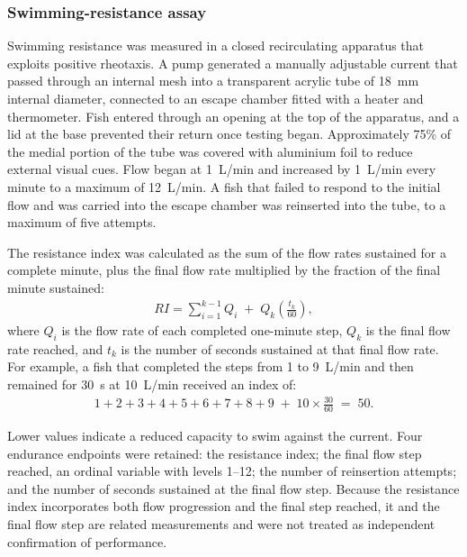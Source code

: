 \documentclass[12pt,a4paper]{article}
\begin{document}
\subsubsection{Swimming-resistance assay}
\label{sec:resistance}
Swimming resistance was measured in a closed recirculating apparatus that exploits positive rheotaxis. A pump generated a manually adjustable current that passed through an internal mesh into a transparent acrylic tube of 18~mm internal diameter, connected to an escape chamber fitted with a heater and thermometer. Fish entered through an opening at the top of the apparatus, and a lid at the base prevented their return once testing began. Approximately 75\% of the medial portion of the tube was covered with aluminium foil to reduce external visual cues. Flow began at 1~L/min and increased by 1~L/min every minute to a maximum of 12~L/min. A fish that failed to respond to the initial flow and was carried into the escape chamber was reinserted into the tube, to a maximum of five attempts.

The resistance index was calculated as the sum of the flow rates sustained for a complete minute, plus the final flow rate multiplied by the fraction of the final minute sustained:
\begin{equation}
\label{eq:resistance-index}
\begin{split}
RI = \sum_{i=1}^{k-1} Q_i \;+\; Q_k\left(\frac{t_k}{60}\right),
\end{split}
\end{equation}
where $Q_i$ is the flow rate of each completed one-minute step, $Q_k$ is the final flow rate reached, and $t_k$ is the number of seconds sustained at that final flow rate. For example, a fish that completed the steps from 1 to 9~L/min and then remained for 30~s at 10~L/min received an index of:
\begin{equation}
\label{eq:resistance-example}
\begin{split}
1+2+3+4+5+6+7+8+9 \;+\; 10 \times \frac{30}{60} \;=\; 50.
\end{split}
\end{equation}

Lower values indicate a reduced capacity to swim against the current. Four endurance endpoints were retained: the resistance index; the final flow step reached, an ordinal variable with levels 1--12; the number of reinsertion attempts; and the number of seconds sustained at the final flow step. Because the resistance index incorporates both flow progression and the final step reached, it and the final flow step are related measurements and were not treated as independent confirmation of performance.
\end{document}
